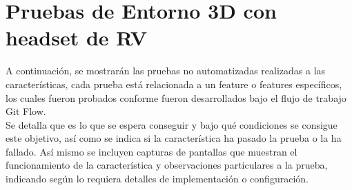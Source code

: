 \section{Pruebas de Entorno 3D con headset de RV}
A continuación, se mostrarán las pruebas no automatizadas realizadas a las características, cada prueba está relacionada a un feature o features específicos, 
los cuales fueron probados conforme fueron desarrollados bajo el flujo de trabajo Git Flow\cite{pathania2017elements}.\\ 
Se detalla que es lo que se espera conseguir y bajo qué condiciones se consigue este objetivo, así como se indica si la característica ha pasado la 
prueba o la ha fallado. Así mismo se incluyen capturas de pantallas que muestran el funcionamiento de la característica y observaciones particulares 
a la prueba, indicando según lo requiera detalles de implementación o configuración.\\

